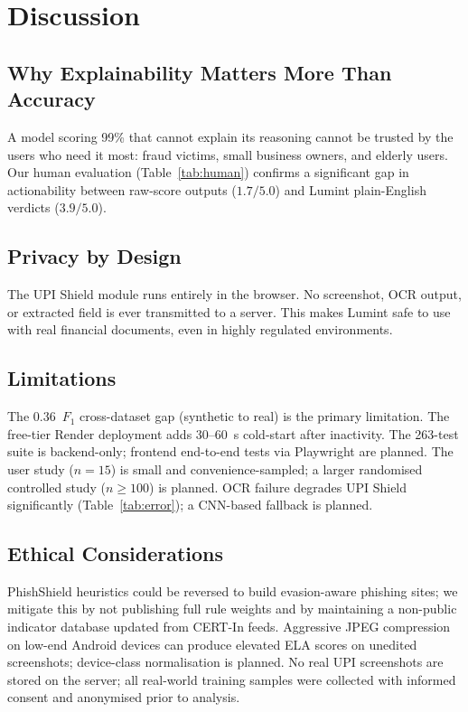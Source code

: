 \documentclass[conference]{IEEEtran}
\begin{document}
\section{Discussion}

\subsection{Why Explainability Matters More Than Accuracy}
A model scoring 99\% that cannot explain its reasoning cannot be trusted
by the users who need it most: fraud victims, small business owners, and
elderly users. Our human evaluation (Table~\ref{tab:human}) confirms a
significant gap in actionability between raw-score outputs
($1.7/5.0$) and Lumint plain-English verdicts ($3.9/5.0$).

\subsection{Privacy by Design}
The UPI Shield module runs entirely in the browser. No screenshot, OCR
output, or extracted field is ever transmitted to a server. This makes
Lumint safe to use with real financial documents, even in highly
regulated environments.

\subsection{Limitations}
The 0.36~$F_1$ cross-dataset gap (synthetic to real) is the primary
limitation. The free-tier Render deployment adds 30--60~s cold-start
after inactivity. The 263-test suite is backend-only; frontend
end-to-end tests via Playwright are planned. The user study ($n{=}15$)
is small and convenience-sampled; a larger randomised controlled study
($n{\geq}100$) is planned. OCR failure degrades UPI Shield
significantly (Table~\ref{tab:error}); a CNN-based fallback is planned.

\subsection{Ethical Considerations}
PhishShield heuristics could be reversed to build evasion-aware
phishing sites; we mitigate this by not publishing full rule weights
and by maintaining a non-public indicator database updated from
CERT-In feeds. Aggressive JPEG compression on low-end Android devices
can produce elevated ELA scores on unedited screenshots;
device-class normalisation is planned. No real UPI screenshots are
stored on the server; all real-world training samples were collected
with informed consent and anonymised prior to analysis.
\end{document}
